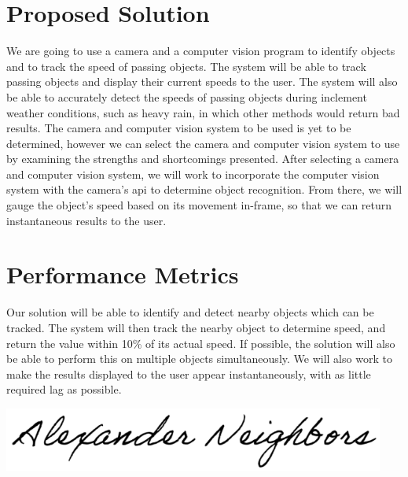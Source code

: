 \documentclass[letterpaper,10pt,onecolumn,draftclsnofoot]{IEEEtran}
\begin{document}
\section{Proposed Solution}

We are going to use a camera and a computer vision program to identify objects and to track the speed of passing objects.
 The system will be able to track passing objects and display their current speeds to the user.
 The system will also be able to accurately detect the speeds of passing objects during inclement weather conditions, such as heavy rain, in which other methods would return bad results.
 The camera and computer vision system to be used is yet to be determined, however we can select the camera and computer vision system to use by examining the strengths and shortcomings presented.
 After selecting a camera and computer vision system, we will work to incorporate the computer vision system with the camera’s api to determine object recognition.
 From there, we will gauge the object’s speed based on its movement in-frame, so that we can return instantaneous results to the user.
 

\section{Performance Metrics}

Our solution will be able to identify and detect nearby objects which can be tracked.
 The system will then track the nearby object to determine speed, and return the value within 10\% of its actual speed.
 If possible, the solution will also be able to perform this on multiple objects simultaneously.
 We will also work to make the results displayed to the user appear instantaneously, with as little required lag as possible.

 

\hfill \break
\hfill \break
\hfill \break

\includegraphics[scale=0.5]{signature}
\end{document}
